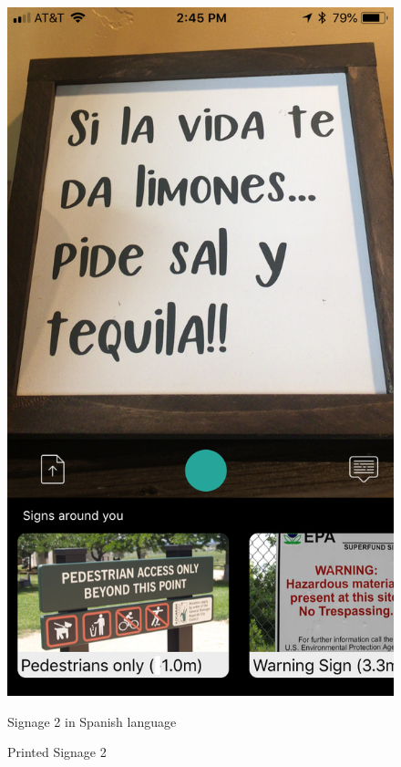 \documentclass[12pt]{article}
\begin{document}
 \begin{figure} [H]
\centering
\begin{minipage}{.5\textwidth}
  \centering
  \includegraphics[width=0.9\linewidth]{media/case4.png}
  \caption{Printed Signage 2}{Signage 2 in Spanish language}
  \label{fig:case4in}
\end{minipage}%
\begin{minipage}{.5\textwidth}
  \centering

\end{minipage}
\end{figure}
\end{document}
